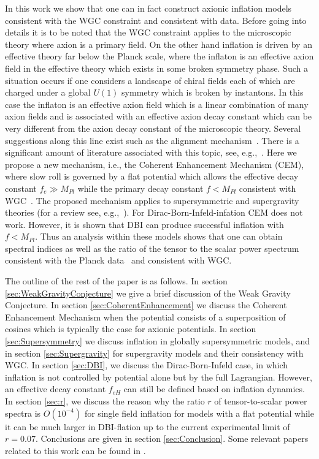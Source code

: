 \documentclass[12pt]{article}
\begin{document}
In this work we show that one can in fact construct axionic inflation models consistent with the WGC constraint and consistent with data.
Before going into details it is to be noted that the WGC constraint applies to the microscopic theory where axion is a primary field.
On the other hand inflation is driven by an effective theory far below the Planck scale, where the inflaton is an effective axion field in the effective theory which exists in some broken symmetry phase.
Such a situation occurs if one considers a landscape of chiral fields each of which are charged under a global $U\left(1\right)$ symmetry which is broken by instantons.
In this case the inflaton is an effective axion field which is a linear combination of many axion fields and is associated with an effective axion decay constant which can be very different from the axion decay constant of the microscopic theory.
Several suggestions along this line exist such as the alignment mechanism~\cite{Kim:2004rp, Long:2014dta}.
There is a significant amount of literature associated with this topic, see, e.g.,~\cite{Rudelius:2015xta, Rudelius:2014wla, Bachlechner:2014gfa, Choi:2014rja, delaFuente:2014aca, Blumenhagen:2014gta, Hebecker:2015rya, Conlon:2016aea, Montero:2015ofa, Junghans:2015hba}.
Here we propose a new mechanism, i.e., the Coherent Enhancement Mechanism (CEM), where slow roll is governed by a flat potential which allows the effective decay constant $f_e \gg M_{Pl}$ while the primary decay constant $f < M_{Pl}$ consistent with WGC~\cite{Nath:2017ihp}.
The proposed mechanism applies to supersymmetric and supergravity theories (for a review see, e.g.,~\cite{Nath:2016qzm}).
For Dirac-Born-Infeld-infation CEM does not work.
However, it is shown that DBI can produce successful inflation with $f < M_{Pl}$.
Thus an analysis within these models shows that one can obtain spectral indices as well as the ratio of the tensor to the scalar power spectrum consistent with the Planck data~\cite{Akrami:2018vks, Akrami:2018odb, Array:2015xqh} and consistent with WGC.

The outline of the rest of the paper is as follows.
In section \ref{sec:WeakGravityConjecture} we give a brief discussion of the Weak Gravity Conjecture.
In section \ref{sec:CoherentEnhancement} we discuss the Coherent Enhancement Mechanism when the potential consists of a superposition of cosines which is typically the case for axionic potentials.
In section \ref{sec:Supersymmetry} we discuss inflation in globally supersymmetric models, and in section \ref{sec:Supergravity} for supergravity models and their consistency with WGC.
In section \ref{sec:DBI}, we discuss the Dirac-Born-Infeld case, in which inflation is not controlled by potential alone but by the full Lagrangian.
However, an effective decay constant $f_{eH}$ can still be defined based on inflation dynamics.
In section \ref{sec:r}, we discuss the reason why the ratio $r$ of tensor-to-scalar power spectra is $O\left(10^{-4}\right)$ for single field inflation for models with a flat potential while it can be much larger in DBI-flation up to the current experimental limit of $r = 0.07$.
Conclusions are given in section \ref{sec:Conclusion}.
Some relevant papers related to this work can be found in \cite{BlancoPillado:2006he, Conlon:2005jm, Ben-Dayan:2014lca, Gao:2014uha}.
\end{document}
